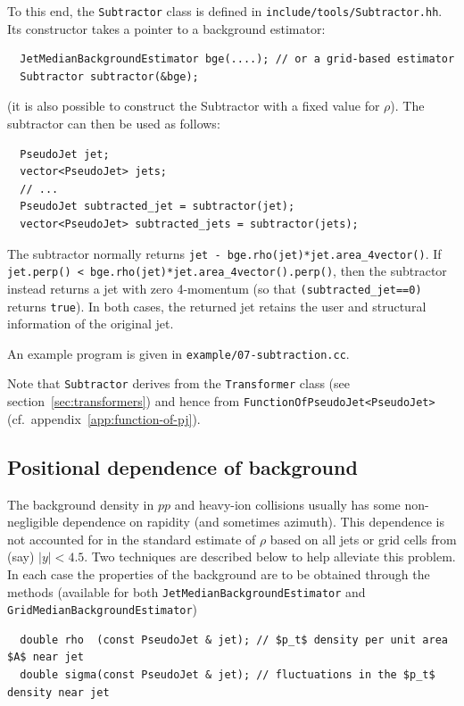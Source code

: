 \documentclass[12pt,a4]{article}
\newcommand{\ttt}[1]{{\small\texttt{#1}}}
\begin{document}
To this end, the \ttt{Subtractor} class is defined in
\ttt{include/tools/Subtractor.hh}. Its constructor takes a pointer to
a background estimator:
\begin{lstlisting}
  JetMedianBackgroundEstimator bge(....); // or a grid-based estimator
  Subtractor subtractor(&bge);
\end{lstlisting}
(it is also possible to construct the Subtractor with a fixed value
for $\rho$).
%
The subtractor can then be used as follows:
\begin{lstlisting}
  PseudoJet jet;
  vector<PseudoJet> jets;
  // ...
  PseudoJet subtracted_jet = subtractor(jet);
  vector<PseudoJet> subtracted_jets = subtractor(jets);
\end{lstlisting}
The subtractor normally returns \ttt{jet - bge.rho(jet)*jet.area\_4vector()}.
%
If \ttt{jet.perp() < bge.rho(jet)*jet.area\_4vector().perp()}, then
the subtractor instead returns a jet with zero 4-momentum (so that
\ttt{(subtracted\_jet==0)} returns \ttt{true}).
%
In both cases, the returned jet retains the user and structural
information of the original jet.

An example program is given in \ttt{example/07-subtraction.cc}.

Note that \ttt{Subtractor} derives from the \ttt{Transformer} class (see
section~\ref{sec:transformers}) and hence from 
\ttt{FunctionOfPseudoJet<PseudoJet>} (cf.\
appendix~\ref{app:function-of-pj}).



\subsection{Positional dependence of background}
\label{sec:BGE-positional}

The background density in $pp$ and heavy-ion collisions usually has
some non-negligible dependence on rapidity (and sometimes azimuth).
%
This dependence is not accounted for in the standard estimate of
$\rho$ based on all jets or grid cells from (say) $|y|<4.5$.
%
Two techniques are described below to help alleviate this problem.
%
In each case the properties of the background are to be obtained
through the methods (available for both
\ttt{JetMedianBackgroundEstimator} and
\ttt{GridMedianBackgroundEstimator})
\begin{lstlisting}
  double rho  (const PseudoJet & jet); // $p_t$ density per unit area $A$ near jet
  double sigma(const PseudoJet & jet); // fluctuations in the $p_t$ density near jet
\end{lstlisting}
\end{document}
